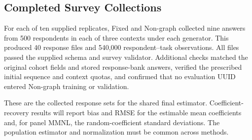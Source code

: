 \subsection{Completed Survey Collections}

For each of ten supplied replicates, Fixed and Non-graph collected nine
answers from 500 respondents in each of three contexts under each generator.
This produced 40 response files and 540,000 respondent--task observations.
All files passed the supplied schema and survey validator. Additional checks
matched the original cohort fields and stored response-bank answers,
verified the prescribed initial sequence and context quotas, and confirmed
that no evaluation UUID entered Non-graph training or validation.

These are the collected response sets for the shared final estimator.
Coefficient-recovery results will report bias and RMSE for the estimable mean
coefficients and, for panel MMNL, the random-coefficient standard deviations.
The population estimator and normalization must be common across methods.

